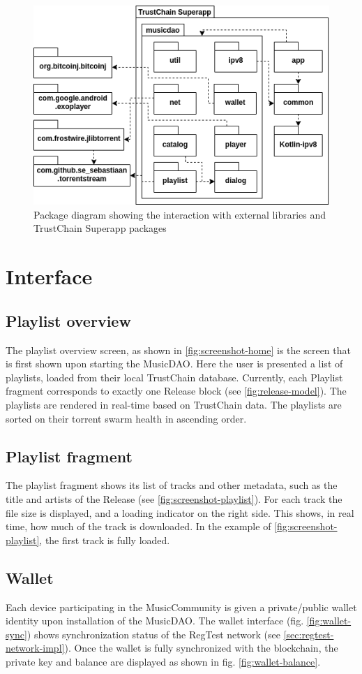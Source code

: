 \begin{figure}
    \includegraphics[width=0.6\linewidth]{implementation/package-diagram.png}
        \caption{Package diagram showing the interaction with external libraries and TrustChain Superapp packages}
    \label{fig:package-diagram}
\end{figure}

\section{Interface}
\subsection{Playlist overview}
The playlist overview screen, as shown in \ref{fig:screenshot-home} is the screen that is first shown upon starting the MusicDAO. Here the user is presented a list of playlists, loaded from their local TrustChain database. Currently, each Playlist fragment corresponds to exactly one Release block (see \ref{fig:release-model}). The playlists are rendered in real-time based on TrustChain data. The playlists are sorted on their torrent swarm health in ascending order. 
\subsection{Playlist fragment}
The playlist fragment shows its list of tracks and other metadata, such as the title and artists of the Release (see \ref{fig:screenshot-playlist}). For each track the file size is displayed, and a loading indicator on the right side. This shows, in real time, how much of the track is downloaded. In the example of \ref{fig:screenshot-playlist}, the first track is fully loaded.
\subsection{Wallet}
Each device participating in the MusicCommunity is given a private/public wallet identity upon installation of the MusicDAO. The wallet interface (fig. \ref{fig:wallet-sync}) shows synchronization status of the RegTest network (see \ref{sec:regtest-network-impl}). Once the wallet is fully synchronized with the blockchain, the private key and balance are displayed as shown in fig. \ref{fig:wallet-balance}. 

